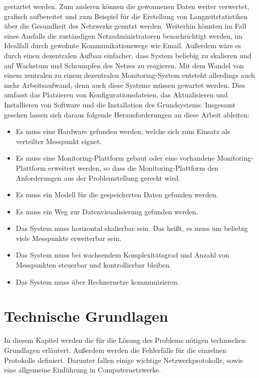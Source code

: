 \documentclass[titlepage]{report}
\begin{document}
gestartet werden. Zum anderen können die gewonnenen Daten weiter
verwertet, grafisch aufbereitet und zum Beispiel für die Erstellung von
Langzeitstatistiken über die Gesundheit des Netzwerks genutzt werden.
Weiterhin könnten im Fall eines Ausfalls die zuständigen
Netzadministratoren benachrichtigt werden, im Idealfall durch gewohnte
Kommunikationswege wie Email. Außerdem wäre es durch einen dezentralen
Aufbau einfacher, dass System beliebig zu skalieren und auf Wachstum und
Schrumpfen des Netzes zu reagieren. Mit dem Wandel von einem zentralen
zu einem dezentralen Monitoring-System entsteht allerdings auch mehr
Arbeitsaufwand, denn auch diese Systeme müssen gewartet werden. Dies
umfasst das Platzieren von Konfigurationsdateien, das Aktualisieren und
Installieren von Software und die Installation des Grundsystems.
Insgesamt gesehen lassen sich daraus folgende Herausforderungen an diese
Arbeit ableiten:
\begin{itemize}
    \item Es muss eine Hardware gefunden werden, welche sich zum Einsatz
          als verteilter Messpunkt eignet.
    \item Es muss eine Monitoring\hyp{}Plattform gebaut oder eine
          vorhandene Monitoring\hyp{}Plattform erweitert werden, so dass die
          Monitoring\hyp{}Plattform den Anforderungen aus der
          Problemstellung gerecht wird.
    \item Es muss ein Modell für die gespeicherten Daten gefunden
          werden.
    \item Es muss ein Weg zur Datenvisualisierung gefunden werden.
    \item Das System muss horizontal skalierbar sein. Das heißt, es
          muss um beliebig viele Messpunkte erweiterbar sein.
    \item Das System muss bei wachsendem Komplexitätsgrad und Anzahl von
          Messpunkten steuerbar und kontrollierbar bleiben.
    \item Das System muss über Rechnernetze kommunizieren.
\end{itemize}
\chapter*{Technische Grundlagen}
In diesem Kapitel werden die für die Lösung des Problems nötigen
technischen Grundlagen erläutert. Außerdem werden die Fehlerfälle für
die einzelnen Protokolle definiert. Darunter fallen einige wichtige
Netzwerkprotokolle, sowie eine allgemeine Einführung in
Computernetzwerke.
\end{document}
